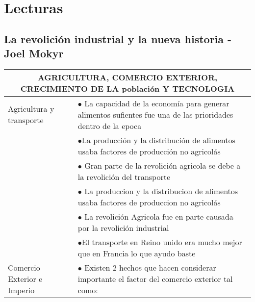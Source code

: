 \section{Lecturas}
\subsection{La revolición industrial y la nueva historia - Joel Mokyr}

\begingroup
\setlength{\tabcolsep}{12pt} %
\renewcommand{\arraystretch}{1.5} %
\begin{tabular}{p{3cm}|p{12cm}}
  \multicolumn{2}{c}{AGRICULTURA, COMERCIO EXTERIOR, CRECIMIENTO DE LA población Y TECNOLOGIA}                                                                                                             \\ \hline
  Agricultura y transporte     & $\bullet$ La capacidad de la economía para generar alimentos sufientes fue una de las prioridades dentro de la epoca                                                      \\
                               & $\bullet$La producción y la distribución de alimentos usaba factores de producción no agricolás                                                                           \\
                               & $\bullet$ Gran parte de la revolición agricola se debe a la revolición del transporte                                                                                     \\
                               & $\bullet$ La produccion y la distribucion de alimentos usaba factores de produccion no agricolás                                                                          \\
                               & $\bullet$ La revolición Agricola fue en parte causada por la revolición industrial                                                                                        \\
                               & $\bullet$El transporte en Reino unido era mucho mejor que en Francia lo que ayudo baste                                                                                   \\ \hline
  Comercio  Exterior e Imperio & $\bullet$ Existen 2 hechos que hacen considerar importante el factor del comercio exterior tal como:                                                                      \\

\end{tabular}
